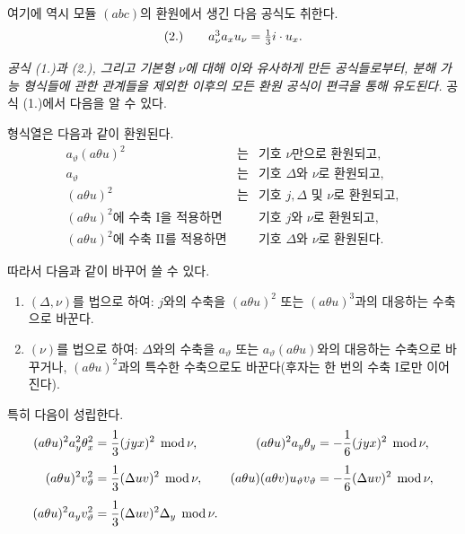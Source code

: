 여기에 역시 모듈 $(abc)$의 환원에서 생긴 다음 공식도 취한다.
\[
\begin{array}{r@{\qquad}l}
(2.) & a_\nu^3a_xu_\nu=\frac13i\cdot u_x.
\end{array}
\]

\emph{공식 (1.)과 (2.), 그리고 기본형 $\nu$에 대해 이와 유사하게 만든 공식들로부터, 분해 가능 형식들에 관한 관계들을 제외한 이후의 모든 환원 공식이 편극을 통해 유도된다.} 공식 (1.)에서 다음을 알 수 있다.

형식열은 다음과 같이 환원된다.
\[
\begin{array}{rcl}
a_\vartheta(a\theta u)^2 &\text{는}& \text{기호 }\nu\text{만으로 환원되고},\\[0.2em]
a_\vartheta &\text{는}& \text{기호 }\Delta\text{와 }\nu\text{로 환원되고},\\[0.2em]
(a\theta u)^2 &\text{는}& \text{기호 }j,\Delta\text{ 및 }\nu\text{로 환원되고},\\[0.2em]
(a\theta u)^2\text{에 수축 I을 적용하면} &\text{}& \text{기호 }j\text{와 }\nu\text{로 환원되고},\\[0.2em]
(a\theta u)^2\text{에 수축 II를 적용하면} &\text{}& \text{기호 }\Delta\text{와 }\nu\text{로 환원된다}.
\end{array}
\]

따라서 다음과 같이 바꾸어 쓸 수 있다.
\begingroup
\renewcommand{\labelenumi}{\arabic{enumi})}
\begin{enumerate}
\item $(\Delta,\nu)$를 법으로 하여: $j$와의 수축을 $(a\theta u)^2$ 또는 $(a\theta u)^3$과의 대응하는 수축으로 바꾼다.
\item $(\nu)$를 법으로 하여: $\Delta$와의 수축을 $a_\vartheta$ 또는 $a_\vartheta(a\theta u)$와의 대응하는 수축으로 바꾸거나, $(a\theta u)^2$과의 특수한 수축으로도 바꾼다(후자는 한 번의 수축 I로만 이어진다).
\end{enumerate}
\endgroup
특히 다음이 성립한다.
\[
\begin{aligned}
(a\theta u)^2a_y^2\theta_x^2&=\frac13(jyx)^2\;\operatorname{mod} \nu,&
(a\theta u)^2a_y\theta_y&=-\frac16(jyx)^2\;\operatorname{mod} \nu,\\[0.4em]
(a\theta u)^2v_\vartheta^2&=\frac13(\Delta uv)^2\;\operatorname{mod} \nu,&
(a\theta u)(a\theta v)u_\vartheta v_\vartheta&=-\frac16(\Delta uv)^2\;\operatorname{mod} \nu,\\[0.4em]
(a\theta u)^2a_yv_\vartheta^2&=\frac13(\Delta uv)^2\Delta_y\;\operatorname{mod} \nu.
\end{aligned}
\]

